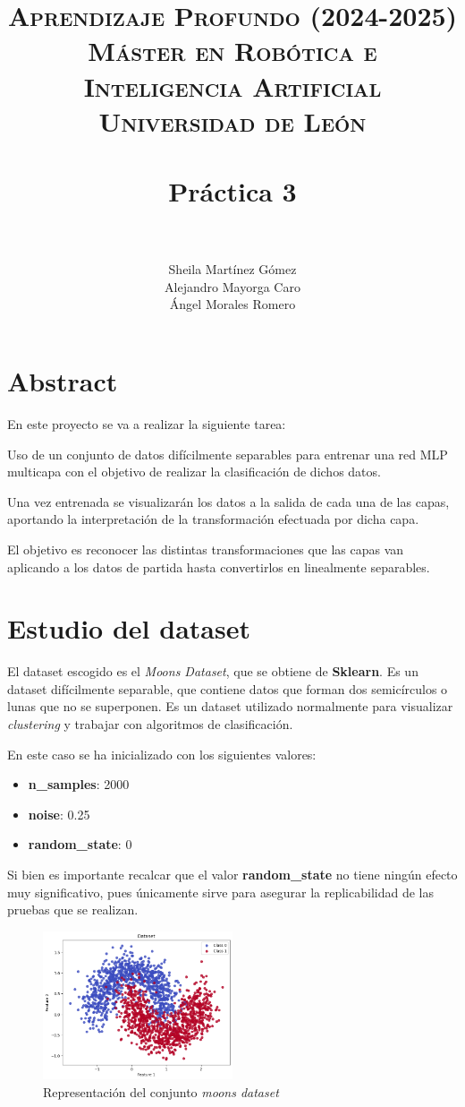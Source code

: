 \documentclass[paper=a4, fontsize=11pt]{scrartcl} %
\title{	
\normalfont \normalsize 
\textsc{{\textbf{Aprendizaje Profundo (2024-2025)}} \\ Máster en Robótica e Inteligencia Artificial \\ Universidad de León} \\ [20pt] %
\horrule{0.5pt} \\[0.4cm] %
\huge Práctica 3 \\   %
\horrule{1.5pt} \\[0.2cm] %
}
\author{Sheila Martínez Gómez\\
Alejandro Mayorga Caro\\
Ángel Morales Romero\\
}
\numberwithin{equation}{section} %
\numberwithin{figure}{section} %
\numberwithin{table}{section} %
\begin{document}
\maketitle
\newpage %

\tableofcontents %
\pagebreak

\section{Abstract}

En este proyecto se va a realizar la siguiente tarea:

Uso de un conjunto de datos difícilmente separables para entrenar una red MLP multicapa con el objetivo de realizar la clasificación de dichos datos. 

Una vez entrenada se visualizarán los datos a la salida de cada una de las capas, aportando la interpretación de la transformación efectuada por dicha capa. 

El objetivo es reconocer las distintas transformaciones que las capas van aplicando a los datos de partida hasta convertirlos en linealmente separables.

\section{Estudio del dataset}

El dataset escogido es el \textit{Moons Dataset}, que se obtiene de \textbf{Sklearn}. Es un dataset difícilmente separable, que contiene datos que forman dos semicírculos o lunas que no se superponen. Es un dataset utilizado normalmente para visualizar \textit{clustering} y trabajar con algoritmos de clasificación. 

En este caso se ha inicializado con los siguientes valores:
\begin{itemize}
    \item \textbf{n\_samples}: 2000
    \item \textbf{noise}: 0.25
    \item \textbf{random\_state}: 0
\end{itemize}

Si bien es importante recalcar que el valor \textbf{random\_state} no tiene ningún efecto muy significativo, pues únicamente sirve para asegurar la replicabilidad de las pruebas que se realizan. 

\begin{figure}[H]
\centering
\includegraphics[width=0.5\textwidth]{images/moons_plot.png}
\caption{Representación del conjunto \textit{moons dataset}}
\end{figure}
\end{document}
